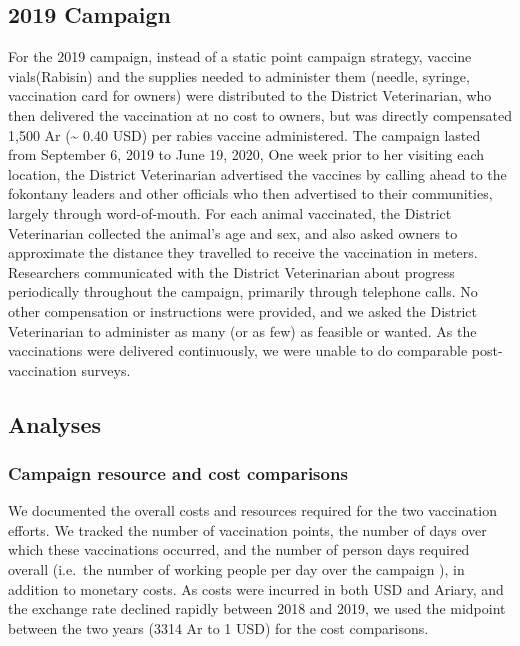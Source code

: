\documentclass[tropicalmed,article,submit,moreauthors,pdftex]{mdpi}
\begin{document}
\hypertarget{campaign-1}{%
\subsection{2019 Campaign}\label{campaign-1}}

For the 2019 campaign, instead of a static point campaign strategy,
vaccine vials(Rabisin) and the supplies needed to administer them
(needle, syringe, vaccination card for owners) were distributed to the
District Veterinarian, who then delivered the vaccination at no cost to
owners, but was directly compensated 1,500 Ar (\textasciitilde{} 0.40
USD) per rabies vaccine administered. The campaign lasted from September
6, 2019 to June 19, 2020, One week prior to her visiting each location,
the District Veterinarian advertised the vaccines by calling ahead to
the fokontany leaders and other officials who then advertised to their
communities, largely through word-of-mouth. For each animal vaccinated,
the District Veterinarian collected the animal's age and sex, and also
asked owners to approximate the distance they travelled to receive the
vaccination in meters. Researchers communicated with the District
Veterinarian about progress periodically throughout the campaign,
primarily through telephone calls. No other compensation or instructions
were provided, and we asked the District Veterinarian to administer as
many (or as few) as feasible or wanted. As the vaccinations were
delivered continuously, we were unable to do comparable post-vaccination
surveys.

\hypertarget{analyses}{%
\subsection{Analyses}\label{analyses}}

\hypertarget{campaign-resource-and-cost-comparisons}{%
\subsubsection{Campaign resource and cost
comparisons}\label{campaign-resource-and-cost-comparisons}}

We documented the overall costs and resources required for the two
vaccination efforts. We tracked the number of vaccination points, the
number of days over which these vaccinations occurred, and the number of
person days required overall (i.e.~the number of working people per day
over the campaign \citep{mazeri2021}), in addition to monetary costs. As
costs were incurred in both USD and Ariary, and the exchange rate
declined rapidly between 2018 and 2019, we used the midpoint between the
two years (3314 Ar to 1 USD) for the cost comparisons.
\end{document}
